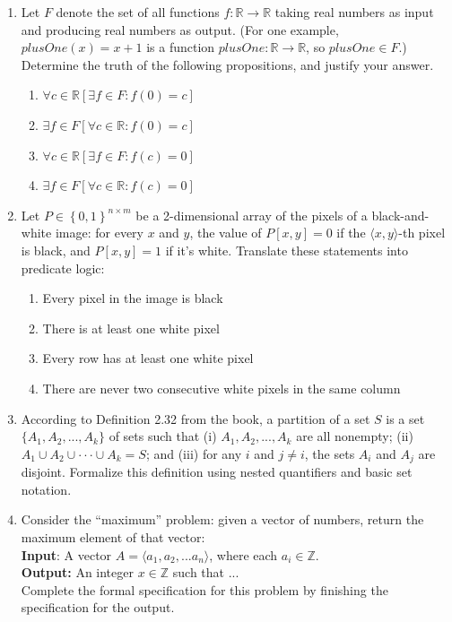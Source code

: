 \documentclass[11pt, oneside]{article}   	%
\newcommand{\reals}{\mathbb{R}}
\newcommand{\ints}{\mathbb{Z}}
\begin{document}
\begin{enumerate}
\item Let $F$ denote the set of all functions $f : \reals \rightarrow \reals$ taking real numbers as input and producing real numbers as output. 
(For one example, $plusOne(x) = x + 1$ is a function $plusOne : \reals \rightarrow \reals$, so $plusOne\in F$.) 
Determine the truth of the following propositions, and justify your answer. 
\begin{enumerate}
\item $\forall c \in \reals \left[\exists f \in F : f(0) = c\right]$
\item $\exists f \in F \left[\forall c \in \reals : f(0) = c\right]$
\item $\forall c \in \reals \left[\exists f \in F : f(c) = 0 \right]$
\item $\exists f \in F \left[\forall c \in \reals : f(c) = 0 \right]$
\end{enumerate}

\item 
Let $P \in \left\{0,1\right\}^{n\times m}$ be a 2-dimensional array of the pixels of a black-and-white image: 
for every $x$ and $y$, the value of $P[x, y] = 0$
if the $\langle x, y\rangle$-th pixel is black, and $P[x, y] = 1$ if it’s white. 
Translate these statements into predicate logic:
\begin{enumerate}
\item Every pixel in the image is black
\item There is at least one white pixel
\item Every row has at least one white pixel
\item There are never two consecutive white pixels in the same column
\end{enumerate}

\item According to Definition 2.32 from the book, 
a partition of a set $S$ is a set $\{A_1, A_2, ... , A_k\}$ of sets such that 
(i) $A_1, A_2, ... , A_k$ are all nonempty; 
(ii) $A_1  \cup A_2 \cup \cdot\cdot\cdot \cup A_k = S$; and 
(iii) for any $i$ and $j\ne i$, the sets $A_i$ and $A_j$ are disjoint. 
Formalize this definition using nested quantifiers and basic set notation.

\item Consider the ``maximum'' problem: given a vector of numbers, return the maximum element of that vector: \vspace{0.5em}\\
\hspace*{3em} \textbf{Input}: A vector $A = \langle a_1, a_2,... a_n\rangle$, where each $a_i \in\ints$.\\
\hspace*{3em}\textbf{Output:} An integer $x\in\ints$ such that  ...\vspace{0.5em}\\
Complete the formal specification for this problem by finishing the specification for the output.


\end{enumerate}
\end{document}
